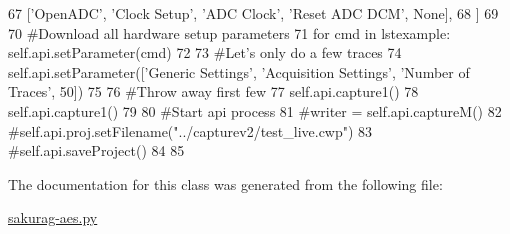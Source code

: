 \begin{DoxyCode}
67                       [\textcolor{stringliteral}{'OpenADC'}, \textcolor{stringliteral}{'Clock Setup'}, \textcolor{stringliteral}{'ADC Clock'}, \textcolor{stringliteral}{'Reset ADC DCM'}, \textcolor{keywordtype}{None}],
68                       ]
69         
70         \textcolor{comment}{#Download all hardware setup parameters}
71         \textcolor{keywordflow}{for} cmd \textcolor{keywordflow}{in} lstexample: self.api.setParameter(cmd)
72         
73         \textcolor{comment}{#Let's only do a few traces}
74         self.api.setParameter([\textcolor{stringliteral}{'Generic Settings'}, \textcolor{stringliteral}{'Acquisition Settings'}, \textcolor{stringliteral}{'Number of Traces'}, 50])
75                       
76         \textcolor{comment}{#Throw away first few}
77         self.api.capture1()
78         self.api.capture1()
79 
80         \textcolor{comment}{#Start api process}
81         \textcolor{comment}{#writer = self.api.captureM()}
82         \textcolor{comment}{#self.api.proj.setFilename("../capturev2/test\_live.cwp")}
83         \textcolor{comment}{#self.api.saveProject()}
84 
85 
\end{DoxyCode}


The documentation for this class was generated from the following file\+:\begin{DoxyCompactItemize}
\item 
\hyperlink{sakurag-aes_8py}{sakurag-\/aes.\+py}\end{DoxyCompactItemize}
